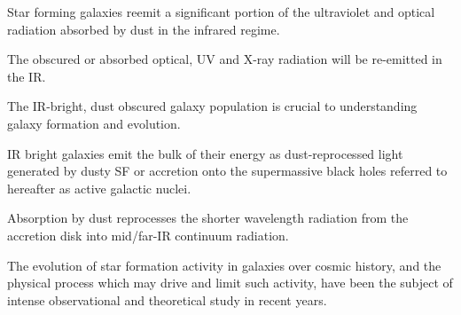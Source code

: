 Star forming galaxies reemit a significant portion of the ultraviolet and optical radiation absorbed by dust in the infrared regime. \cite{symeonidis_agn_2021, fu_decomposing_2010}

The obscured or absorbed optical, UV and X-ray radiation will be re-emitted in the IR. \cite{han_evolution_2012, brown_infrared_2019}

The IR-bright, dust obscured galaxy population is crucial to understanding galaxy formation and evolution. \cite{gruppioni_modelling_2011}

IR bright galaxies emit the bulk of their energy as dust-reprocessed light generated by dusty SF or accretion onto the supermassive black holes referred to hereafter as active galactic nuclei. \cite{wu_mid-infrared_2011}

Absorption by dust reprocesses the shorter wavelength radiation from the accretion disk into mid/far-IR continuum radiation. \cite{assef_mid-ir-_2011}

\color{Goldenrod}
The evolution of star formation activity in galaxies over cosmic history, and the physical process which may drive and limit such activity, have been the subject of intense observational and theoretical study in recent years. \cite{grazian_galaxy_2015}